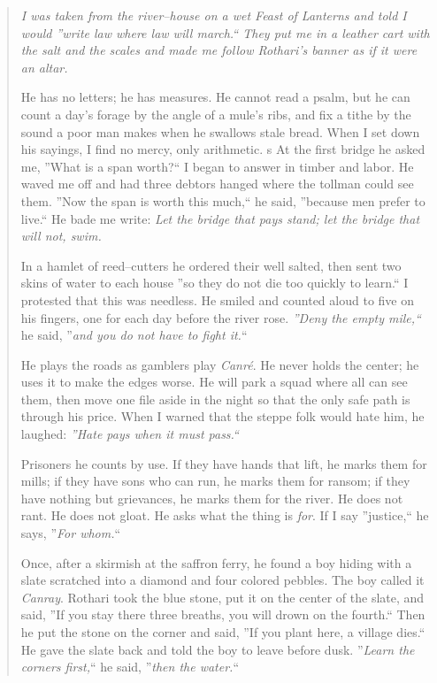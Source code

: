 \documentclass[11pt]{article}
\begin{document}
\begin{quote}\small\itshape
\noindent
I was taken from the river--house on a wet Feast of Lanterns and told I would ''write law where law will march.`` They put me in a leather cart with the salt and the scales and made me follow Rothari's banner as if it were an altar.

He has no letters; he has measures. He cannot read a psalm, but he can count a day's forage by the angle of a mule's ribs, and fix a tithe by the sound a poor man makes when he swallows stale bread. When I set down his sayings, I find no mercy, only arithmetic.
s
At the first bridge he asked me, ''What is a span worth?`` I began to answer in timber and labor. He waved me off and had three debtors hanged where the tollman could see them. ''Now the span is worth this much,`` he said, ''because men prefer to live.`` He bade me write: \emph{Let the bridge that pays stand; let the bridge that will not, swim.}

In a hamlet of reed--cutters he ordered their well salted, then sent two skins of water to each house ''so they do not die too quickly to learn.`` I protested that this was needless. He smiled and counted aloud to five on his fingers, one for each day before the river rose. \emph{''Deny the empty mile,``} he said, ''\emph{and you do not have to fight it.}``

He plays the roads as gamblers play \emph{Canré}. He never holds the center; he uses it to make the edges worse. He will park a squad where all can see them, then move one file aside in the night so that the only safe path is through his price. When I warned that the steppe folk would hate him, he laughed: \emph{''Hate pays when it must pass.``}

Prisoners he counts by use. If they have hands that lift, he marks them for mills; if they have sons who can run, he marks them for ransom; if they have nothing but grievances, he marks them for the river. He does not rant. He does not gloat. He asks what the thing is \emph{for}. If I say ''justice,`` he says, ''\emph{For whom.}``

Once, after a skirmish at the saffron ferry, he found a boy hiding with a slate scratched into a diamond and four colored pebbles. The boy called it \emph{Canray}. Rothari took the blue stone, put it on the center of the slate, and said, ''If you stay there three breaths, you will drown on the fourth.`` Then he put the stone on the corner and said, ''If you plant here, a village dies.`` He gave the slate back and told the boy to leave before dusk. ''\emph{Learn the corners first,}`` he said, ''\emph{then the water.}``


\end{quote}
\end{document}

